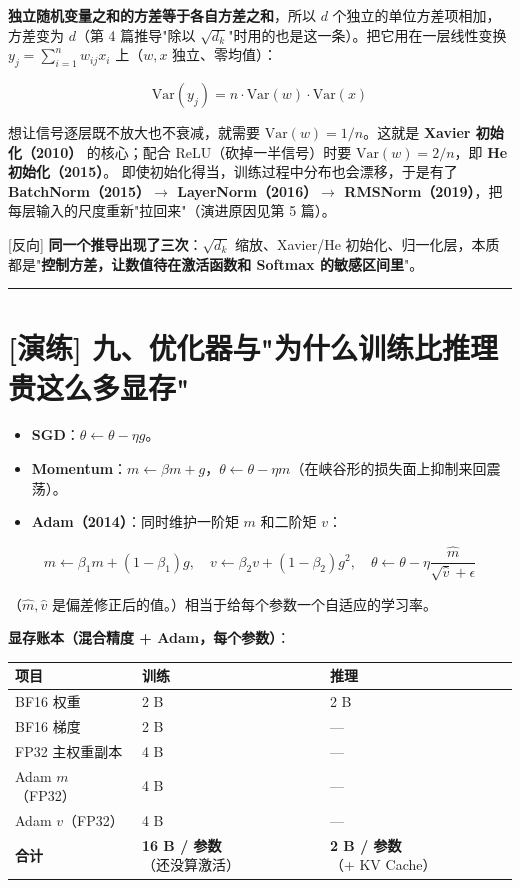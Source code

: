 \textbf{独立随机变量之和的方差等于各自方差之和}，所以 $d$ 个独立的单位方差项相加，方差变为 $d$（第 4 篇推导"除以 $\sqrt{d_k}$"时用的也是这一条）。把它用在一层线性变换 $y_j = \sum_{i=1}^{n} w_{ij} x_i$ 上（$w, x$ 独立、零均值）：

\[
\text{Var}(y_j) = n \cdot \text{Var}(w) \cdot \text{Var}(x)
\]

想让信号逐层既不放大也不衰减，就需要 $\text{Var}(w) = 1/n$。这就是 \textbf{Xavier 初始化（2010）} 的核心；配合 ReLU（砍掉一半信号）时要 $\text{Var}(w) = 2/n$，即 \textbf{He 初始化（2015）}。
即使初始化得当，训练过程中分布也会漂移，于是有了 \textbf{BatchNorm（2015）$\rightarrow$ LayerNorm（2016）$\rightarrow$ RMSNorm（2019）}，把每层输入的尺度重新"拉回来"（演进原因见第 5 篇）。

\begin{mathBox}[核心数学定理推导]
{}[反向] \textbf{同一个推导出现了三次}：$\sqrt{d_k}$ 缩放、Xavier/He 初始化、归一化层，本质都是"\textbf{控制方差，让数值待在激活函数和 Softmax 的敏感区间里}"。
\end{mathBox}

\vspace{0.8em}\hrule\vspace{0.8em}

\section{[演练] 九、优化器与"为什么训练比推理贵这么多显存"}

\begin{itemize}
  \item \textbf{SGD}：$\theta \leftarrow \theta - \eta g$。
  \item \textbf{Momentum}：$m \leftarrow \beta m + g$，$\theta \leftarrow \theta - \eta m$（在峡谷形的损失面上抑制来回震荡）。
  \item \textbf{Adam（2014）}：同时维护一阶矩 $m$ 和二阶矩 $v$：
\end{itemize}

\[
m \leftarrow \beta_1 m + (1-\beta_1) g, \quad v \leftarrow \beta_2 v + (1-\beta_2) g^2, \quad \theta \leftarrow \theta - \eta \frac{\hat{m}}{\sqrt{\hat{v}} + \epsilon}
\]

（$\hat{m}, \hat{v}$ 是偏差修正后的值。）相当于给每个参数一个自适应的学习率。

\textbf{显存账本（混合精度 + Adam，每个参数）}：

\begin{center}
\small
\begin{tabularx}{\textwidth}{p{3cm} p{4.5cm} X}
\toprule
\textbf{项目} & \textbf{训练} & \textbf{推理} \\
\midrule
BF16 权重 & 2 B & 2 B \\
BF16 梯度 & 2 B & — \\
FP32 主权重副本 & 4 B & — \\
Adam $m$（FP32） & 4 B & — \\
Adam $v$（FP32） & 4 B & — \\
\textbf{合计} & \textbf{16 B / 参数}（还没算激活） & \textbf{2 B / 参数}（+ KV Cache） \\
\bottomrule
\end{tabularx}
\end{center}

